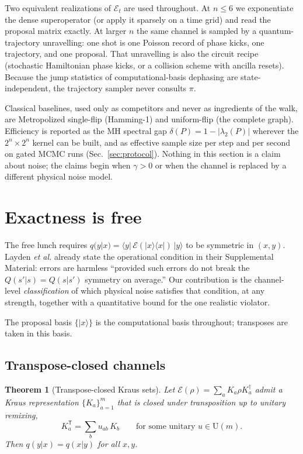 \documentclass[aps,prx,reprint,floatfix,amsmath,amssymb,amsfonts]{revtex4-2}
\newtheorem{theorem}{Theorem}
\begin{document}
Two equivalent realizations of $\mathcal{E}_t$ are used throughout. At
$n \le 6$ we exponentiate the dense superoperator (or apply it sparsely
on a time grid) and read the proposal matrix exactly. At larger $n$ the
same channel is sampled by a quantum-trajectory unravelling: one shot is
one Poisson record of phase kicks, one trajectory, and one proposal.
That unravelling is also the circuit recipe (stochastic Hamiltonian
phase kicks, or a collision scheme with ancilla resets). Because the
jump statistics of computational-basis dephasing are state-independent,
the trajectory sampler never consults $\pi$.

Classical baselines, used only as competitors and never as ingredients
of the walk, are Metropolized single-flip (Hamming-1) and uniform-flip
(the complete graph). Efficiency is reported as the MH spectral gap
$\delta(P) = 1-|\lambda_2(P)|$ wherever the $2^n \times 2^n$ kernel can
be built, and as effective sample size per step and per second on gated
MCMC runs (Sec.~\ref{sec:protocol}). Nothing in this section is a claim
about noise; the claims begin when $\gamma > 0$ or when the channel is
replaced by a different physical noise model.

\section{Exactness is free}
\label{sec:exactness}

The free lunch requires
$q(y|x) = \langle y|\, \mathcal{E}(|x\rangle\langle x|) \,|y\rangle$ to
be symmetric in $(x,y)$. Layden \emph{et al.} already state the
operational condition in their Supplemental Material: errors are
harmless ``provided such errors do not break the $Q(s'|s)=Q(s|s')$
symmetry on average.'' Our contribution is the channel-level
\emph{classification} of which physical noise satisfies that condition,
at any strength, together with a quantitative bound for the one
realistic violator.

The proposal basis $\{|x\rangle\}$ is the computational basis
throughout; transposes are taken in this basis.

\subsection{Transpose-closed channels}

\begin{theorem}[Transpose-closed Kraus sets]
\label{thm:tc}
Let $\mathcal{E}(\rho) = \sum_a K_a \rho K_a^\dagger$ admit a Kraus
representation $\{K_a\}_{a=1}^{m}$ that is closed under transposition
up to unitary remixing,
\begin{equation}
  K_a^{\mathsf T}
  =
  \sum_b u_{ab}\, K_b
  \qquad
  \text{for some unitary } u \in \mathrm{U}(m).
  \tag{TC}
\end{equation}
Then $q(y|x) = q(x|y)$ for all $x,y$.
\end{theorem}
\end{document}
